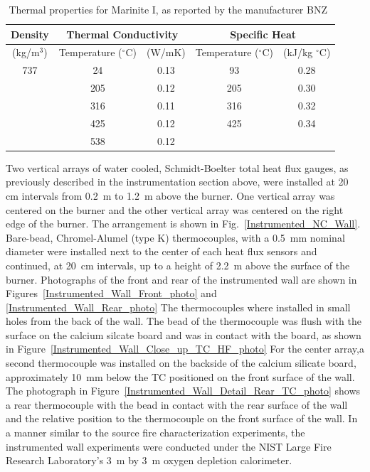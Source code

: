 \documentclass[twoside]{uocthesis}
\begin{document}
{\begin{table}
	\centering
\begin{tabular}{|c|c|c|c|c|}
	\hline Density & \multicolumn{2}{c|}{Thermal Conductivity} & \multicolumn{2}{c|}{Specific Heat}   \\
    \hline (kg/m$^3$) & Temperature ($^\circ$C) & (W/mK)  & Temperature ($^\circ$C)  & (kJ/kg $^\circ$C) \\
	\hline 737  & 24 & 0.13 & 93 & 0.28 \\
	\hline  & 205 & 0.12  & 205 & 0.30 \\
	\hline  & 316 & 0.11 & 316 & 0.32 \\
	\hline  & 425 & 0.12 & 425 & 0.34 \\
	\hline  & 538 & 0.12 &  &  \\
	\hline
\end{tabular}
\caption[Thermal properties for Marinite I]{Thermal properties for Marinite I, as reported by the manufacturer BNZ~\cite{Marinite:1997}}
\label{tab:Marinite_Thermal_Properties}
\end{table}

Two vertical arrays of water cooled, Schmidt-Boelter total heat flux gauges, as previously described in the instrumentation section above, were installed at 20 cm intervals from 0.2~m to 1.2~m above the burner.  One vertical array was centered on the burner and the other vertical array was centered on the right edge of the burner. The arrangement is shown in Fig.~\ref{Instrumented_NC_Wall}. Bare-bead, Chromel-Alumel (type K) thermocouples, with a 0.5~mm nominal diameter were installed next to the center of each heat flux sensors and continued, at 20~cm intervals, up to a height of 2.2~m above the surface of the burner. Photographs of the front and rear of the instrumented wall are shown in Figures~\ref{Instrumented_Wall_Front_photo} and \ref{Instrumented_Wall_Rear_photo} The thermocouples where installed in small holes from the back of the wall.  The bead of the thermocouple was flush with the surface on the calcium silcate board and was in contact with the board, as shown in Figure~\ref{Instrumented_Wall_Close_up_TC_HF_photo} For the center array,a second thermocouple was installed on the backside of the calcium silicate board, approximately 10~mm below the TC positioned on the front surface of the wall. The photograph in Figure~\ref{Instrumented_Wall_Detail_Rear_TC_photo} shows a rear thermocouple with the bead in contact with the rear surface of the wall and the relative position to the thermocouple on the front surface of the wall. In a manner similar to the source fire characterization experiments, the instrumented wall experiments were conducted under the NIST Large Fire Research Laboratory's 3~m by 3~m oxygen depletion calorimeter.

}
\end{document}

